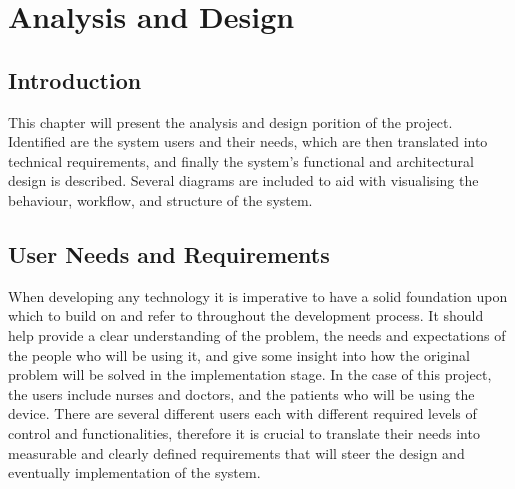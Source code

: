 \chapter{Analysis and Design}

\section{Introduction} %
This chapter will present the analysis and design porition of the project. Identified are the system users and their needs, which are then translated into technical requirements, and finally the system's functional and architectural design is described. Several diagrams are included to aid with visualising the behaviour, workflow, and structure of the system.

\section{User Needs and Requirements} %
When developing any technology it is imperative to have a solid foundation upon which to build on and refer to throughout the development process. It should help provide a clear understanding of the problem, the needs and expectations of the people who will be using it, and give some insight into how the original problem will be solved in the implementation stage. In the case of this project, the users include nurses and doctors, and the patients who will be using the device. There are several different users each with different required levels of control and functionalities, therefore it is crucial to translate their needs into measurable and clearly defined requirements that will steer the design and eventually implementation of the system.

